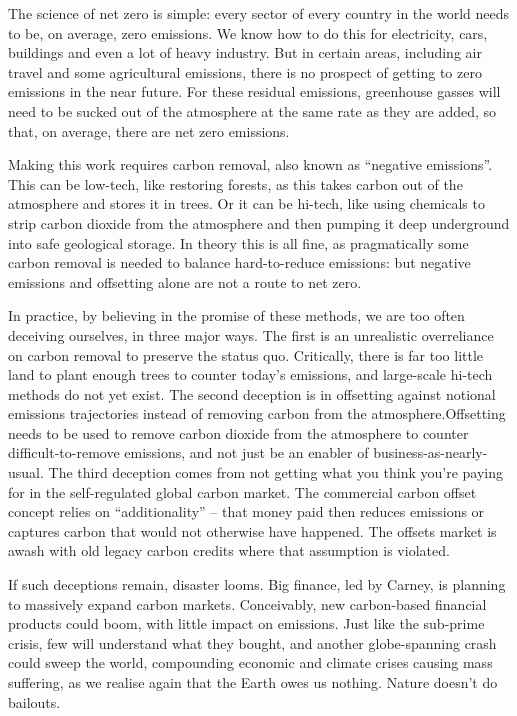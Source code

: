 \documentclass[
]{book}
\begin{document}
The science of net zero is simple: every sector of every country in the world needs to be, on average, zero emissions. We know how to do this for electricity, cars, buildings and even a lot of heavy industry. But in certain areas, including air travel and some agricultural emissions, there is no prospect of getting to zero emissions in the near future. For these residual emissions, greenhouse gasses will need to be sucked out of the atmosphere at the same rate as they are added, so that, on average, there are net zero emissions.

Making this work requires carbon removal, also known as ``negative emissions''. This can be low-tech, like restoring forests, as this takes carbon out of the atmosphere and stores it in trees. Or it can be hi-tech, like using chemicals to strip carbon dioxide from the atmosphere and then pumping it deep underground into safe geological storage. In theory this is all fine, as pragmatically some carbon removal is needed to balance hard-to-reduce emissions: but negative emissions and offsetting alone are not a route to net zero.

In practice, by believing in the promise of these methods, we are too often deceiving ourselves, in three major ways. The first is an unrealistic overreliance on carbon removal to preserve the status quo.
Critically, there is far too little land to plant enough trees to counter today's emissions, and large-scale hi-tech methods do not yet exist.
The second deception is in offsetting against notional emissions trajectories instead of removing carbon from the atmosphere.Offsetting needs to be used to remove carbon dioxide from the atmosphere to counter difficult-to-remove emissions, and not just be an enabler of business-as-nearly-usual.
The third deception comes from not getting what you think you're paying for in the self-regulated global carbon market. The commercial carbon offset concept relies on ``additionality'' -- that money paid then reduces emissions or captures carbon that would not otherwise have happened.
The offsets market is awash with old legacy carbon credits where that assumption is violated.

If such deceptions remain, disaster looms. Big finance, led by Carney, is planning to massively expand carbon markets. Conceivably, new carbon-based financial products could boom, with little impact on emissions. Just like the sub-prime crisis, few will understand what they bought, and another globe-spanning crash could sweep the world, compounding economic and climate crises causing mass suffering, as we realise again that the Earth owes us nothing. Nature doesn't do bailouts.
\end{document}
